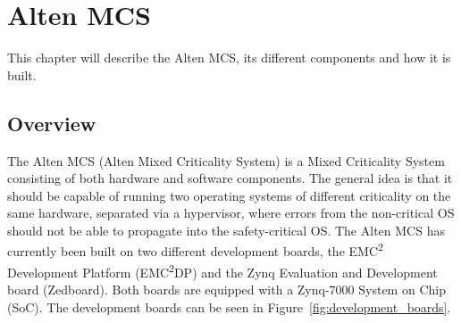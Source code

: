 \chapter{Alten MCS}
\label{sec:lit_emc2mcs}
This chapter will describe the Alten MCS, its different components and how it is built.

\section{Overview}
The Alten MCS (Alten Mixed Criticality System) is a Mixed Criticality System consisting of both hardware and software components. The general idea is that it should be capable of running two operating systems of different criticality on the same hardware, separated via a hypervisor, where errors from the non-critical OS should not be able to propagate into the safety-critical OS. The Alten MCS has currently been built on two different development boards, the EMC\textsuperscript{2} Development Platform (EMC\textsuperscript{2}DP) and the Zynq Evaluation and Development board (Zedboard). Both boards are equipped with a Zynq-7000 System on Chip (SoC). The development boards can be seen in Figure~\ref{fig:development_boards}.

